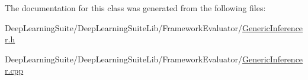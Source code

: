 The documentation for this class was generated from the following files\+:\begin{DoxyCompactItemize}
\item 
Deep\+Learning\+Suite/\+Deep\+Learning\+Suite\+Lib/\+Framework\+Evaluator/\hyperlink{_generic_inferencer_8h}{Generic\+Inferencer.\+h}\item 
Deep\+Learning\+Suite/\+Deep\+Learning\+Suite\+Lib/\+Framework\+Evaluator/\hyperlink{_generic_inferencer_8cpp}{Generic\+Inferencer.\+cpp}\end{DoxyCompactItemize}
